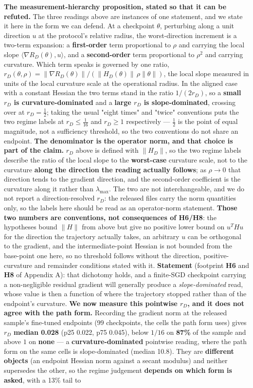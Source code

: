 \documentclass[pdflatex,sn-mathphys-ay]{sn-jnl}
\begin{document}
\textbf{The measurement-hierarchy proposition, stated so that it can be refuted.} The three readings above are instances of one statement, and we state it here in the form we can defend. At a checkpoint $\theta$, perturbing along a unit direction $u$ at the protocol's relative radius, the worst-direction increment is a two-term expansion: a \textbf{first-order} term proportional to $\rho$ and carrying the local slope $\langle\nabla R_D(\theta),u\rangle$, and a \textbf{second-order} term proportional to $\rho^2$ and carrying curvature. Which term speaks is governed by one ratio, $r_D(\theta,\rho) = \|\nabla R_D(\theta)\| / (\|H_D(\theta)\|\,\rho\|\theta\|)$, the local slope measured in units of the local curvature scale at the operational radius. In the aligned case with a constant Hessian the two terms stand in the ratio $1/(2r_D)$, so a \textbf{small $r_D$ is curvature-dominated} and a \textbf{large $r_D$ is slope-dominated}, crossing over at $r_D=\frac12$; taking the usual "eight times" and "twice" conventions puts the two regime labels at $r_D\le\frac1{16}$ and $r_D\ge1$ respectively --- $\frac12$ is the point of equal magnitude, not a sufficiency threshold, so the two conventions do not share an endpoint. \textbf{The denominator is the operator norm, and that choice is part of the claim.} $r_D$ above is defined with $\|H_D\|$, so the two regime labels describe the ratio of the local slope to the \textbf{worst-case} curvature scale, not to the curvature \textbf{along the direction the reading actually follows}; as $\rho\to0$ that direction tends to the gradient direction, and the second-order coefficient is the curvature along it rather than $\lambda_{\max}$. The two are not interchangeable, and we do not report a direction-resolved $r_D$: the released files carry the norm quantities only, so the labels here should be read as an operator-norm statement. \textbf{Those two numbers are conventions, not consequences of H6/H8}: the hypotheses bound $\|H\|$ from above but give no positive lower bound on $u^{T}Hu$ for the direction the trajectory actually takes, an arbitrary $u$ can be orthogonal to the gradient, and the intermediate-point Hessian is not bounded from the base-point one here, so no threshold follows without the direction, positive-curvature and remainder conditions stated with it. \textbf{Statement} (footprint \textbf{H6} and \textbf{H8} of Appendix A): that dichotomy holds, and a finite-SGD checkpoint carrying a non-negligible residual gradient will generally produce a \emph{slope-dominated} read, whose value is then a function of where the trajectory stopped rather than of the endpoint's curvature. \textbf{We now measure this pointwise $r_D$, and it does not agree with the path form.} Recording the gradient norm at the released sample's fine-tuned endpoints (99 checkpoints, the cells the path form uses) gives $r_D$ \textbf{median 0.028} (p25 0.022, p75 0.045), below $1/16$ on \textbf{87\%} of the sample and above $1$ on \textbf{none} --- a \textbf{curvature-dominated} pointwise reading, where the path form on the same cells is slope-dominated (median 10.8). They are \textbf{different objects} (an endpoint Hessian norm against a secant modulus) and neither supersedes the other, so the regime judgement \textbf{depends on which form is asked}, with a 13\% tail to 
\end{document}
